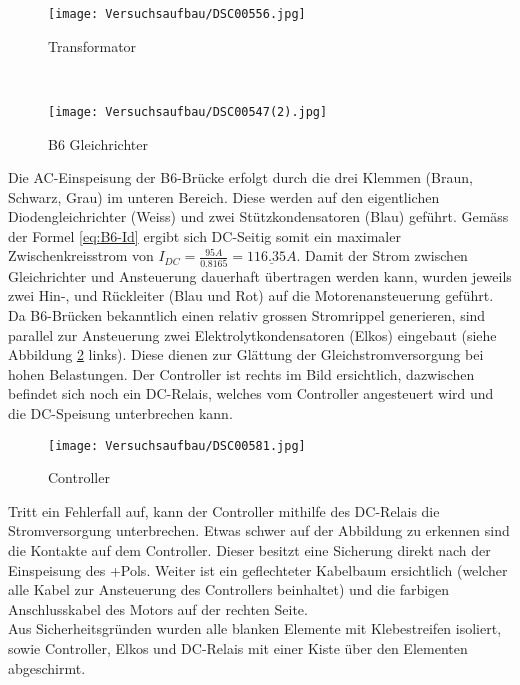 \begin{figure}[H]
	\centering
	\begin{minipage}[H]{.4\linewidth} %
		\centering
		\texttt{[image: Versuchsaufbau/DSC00556.jpg]}
		\caption[Transformator Versuchsaufbau]{Transformator}
		\label{fig:Trafo}
	\end{minipage}
	\ %
	\begin{minipage}[H]{.4\linewidth} %
		\centering
		\texttt{[image: Versuchsaufbau/DSC00547(2).jpg]}
		\caption[B6 Gleichrichter]{B6 Gleichrichter}
		\label{fig:B6}
	\end{minipage}
\end{figure}

Die AC-Einspeisung der B6-Brücke erfolgt durch die drei Klemmen (Braun, Schwarz, Grau) im unteren Bereich. Diese werden auf den eigentlichen Diodengleichrichter (Weiss) und zwei Stützkondensatoren (Blau) geführt. Gemäss der Formel \ref{eq:B6-Id} ergibt sich DC-Seitig somit ein maximaler Zwischenkreisstrom von $I_{DC}=\frac{95A}{0.8165} =\underline{116.35A}$.
Damit der Strom zwischen Gleichrichter und Ansteuerung dauerhaft übertragen werden kann, wurden jeweils zwei Hin-, und Rückleiter (Blau und Rot) auf die Motorenansteuerung geführt.\\
Da B6-Brücken bekanntlich einen relativ grossen Stromrippel generieren, sind parallel zur Ansteuerung zwei Elektrolytkondensatoren (Elkos) eingebaut (siehe Abbildung \ref{fig:Controller} links). Diese dienen zur Glättung der Gleichstromversorgung bei hohen Belastungen. Der Controller ist rechts im Bild ersichtlich, dazwischen befindet sich noch ein DC-Relais, welches vom Controller angesteuert wird und die DC-Speisung unterbrechen kann.

\begin{figure}[H]
	\begin{center}
		\texttt{[image: Versuchsaufbau/DSC00581.jpg]}
		\caption[Controller]{Controller}
		\label{fig:Controller}
	\end{center}
\end{figure}

Tritt ein Fehlerfall auf, kann der Controller mithilfe des DC-Relais die Stromversorgung unterbrechen. Etwas schwer auf der Abbildung zu erkennen sind die Kontakte auf dem Controller. Dieser besitzt eine Sicherung direkt nach der Einspeisung des +Pols. Weiter ist ein geflechteter Kabelbaum ersichtlich (welcher alle Kabel zur Ansteuerung des Controllers beinhaltet) und die farbigen Anschlusskabel des Motors auf der rechten Seite.\\
Aus Sicherheitsgründen wurden alle blanken Elemente mit Klebestreifen isoliert, sowie Controller, Elkos und DC-Relais mit einer Kiste über den Elementen abgeschirmt.


